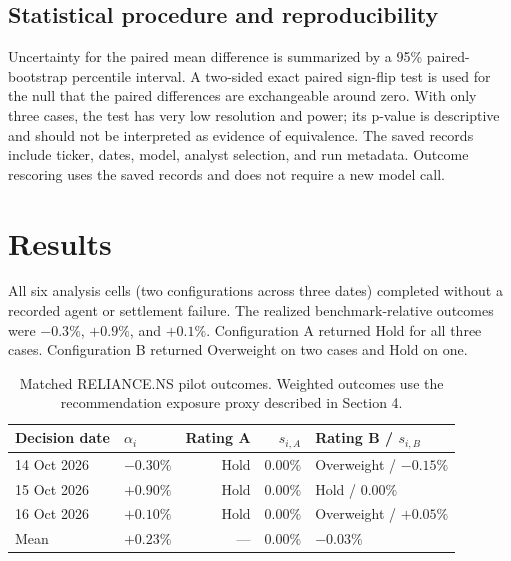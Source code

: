 \documentclass[10pt]{article}
\begin{document}
\subsection{Statistical procedure and reproducibility}
Uncertainty for the paired mean difference is summarized by a 95\% paired-bootstrap percentile interval. A two-sided exact paired sign-flip test is used for the null that the paired differences are exchangeable around zero. With only three cases, the test has very low resolution and power; its p-value is descriptive and should not be interpreted as evidence of equivalence. The saved records include ticker, dates, model, analyst selection, and run metadata. Outcome rescoring uses the saved records and does not require a new model call.

\section{Results}
All six analysis cells (two configurations across three dates) completed without a recorded agent or settlement failure. The realized benchmark-relative outcomes were $-0.3\%$, $+0.9\%$, and $+0.1\%$. Configuration A returned Hold for all three cases. Configuration B returned Overweight on two cases and Hold on one.

\begin{table}[ht]
\centering
\caption{Matched RELIANCE.NS pilot outcomes. Weighted outcomes use the recommendation exposure proxy described in Section 4.}
\label{tab:outcomes}
\small
\begin{tabular}{llrrl}
\toprule
Decision date & $\alpha_i$ & Rating A & $s_{i,A}$ & Rating B / $s_{i,B}$\\
\midrule
14 Oct 2026 & $-0.30\%$ & Hold & $0.00\%$ & Overweight / $-0.15\%$\\
15 Oct 2026 & $+0.90\%$ & Hold & $0.00\%$ & Hold / $0.00\%$\\
16 Oct 2026 & $+0.10\%$ & Hold & $0.00\%$ & Overweight / $+0.05\%$\\
\midrule
Mean & $+0.23\%$ & --- & $0.00\%$ & $-0.03\%$\\
\bottomrule
\end{tabular}
\end{table}
\end{document}
